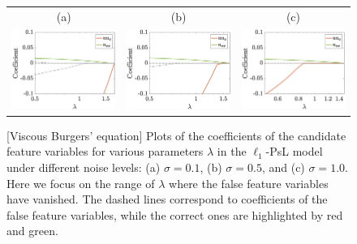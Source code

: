 \documentclass[a4paper,11pt]{article}
\begin{document}
\begin{figure}
\centering
\begin{tabular}{ccc}
(a)&(b)&(c)\\
\includegraphics[width=2in]{Figures/visburgers_0_1.eps}&
\includegraphics[width=2in]{Figures/visburgers_0_5.eps}&
\includegraphics[width=2in]{Figures/visburgers_1.eps}
\end{tabular}	
\caption{[Viscous Burgers' equation] Plots of the coefficients of the candidate feature variables for various parameters $\lambda$ in the $\ell_1$-PsL model under different noise levels: (a) $\sigma=0.1$, (b) $\sigma=0.5$, and (c) $\sigma=1.0$. Here we focus on the range of $\lambda$ where the false feature variables have vanished. The dashed lines correspond to coefficients of the false feature variables, while the correct ones are highlighted by red and green.}\label{expr.visburgers}
\end{figure}
\end{document}
